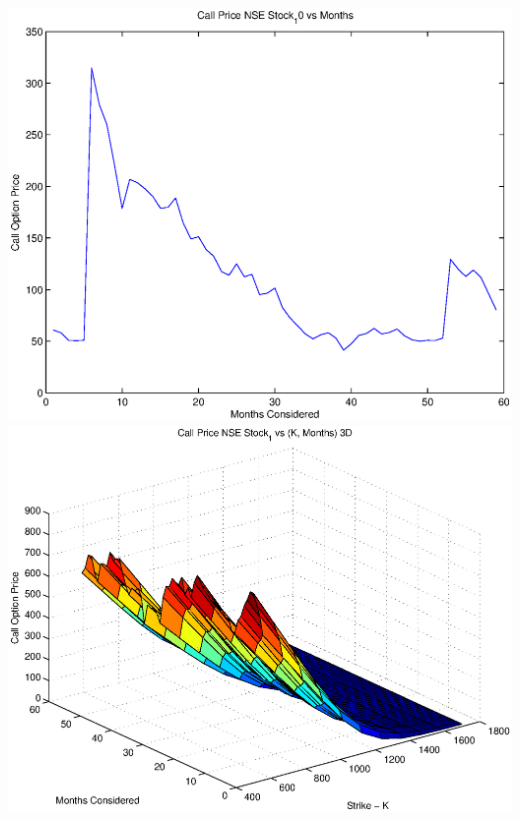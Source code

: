 \documentclass{article}
\begin{document}
\includegraphics[width=\textwidth]{Call_Price_NSE_Stock_10_vs_Months} \\

\includegraphics[width=\textwidth]{Call_Price_NSE_Stock_1_vs_(K,_Months)_3D} \\
\end{document}
